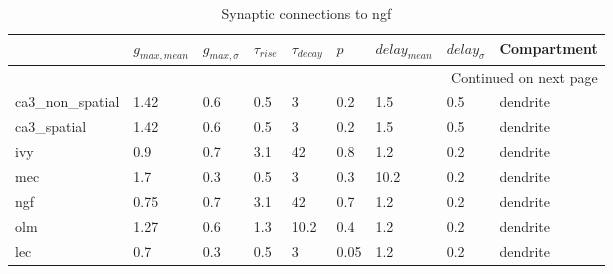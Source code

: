 \begin{longtable}{lllllllll}
\caption{Synaptic connections to ngf}\label{ngf_synapses}\\
\toprule
{} &  $g_{max, mean}$ & $g_{max, \sigma}$ & $\tau_{rise}$ & $\tau_{decay}$ &  $p$ & $delay_{mean}$ & $delay_{\sigma}$ & Compartment \\
\midrule
\endhead
\midrule
\multicolumn{9}{r}{{Continued on next page}} \\
\midrule
\endfoot

\bottomrule
\endlastfoot
ca3\_non\_spatial &  1.42 &      0.6 &      0.5 &         3 &   0.2 &   1.5 &       0.5 &      dendrite\ \\
ca3\_spatial     &  1.42 &      0.6 &      0.5 &         3 &   0.2 &   1.5 &       0.5 &      dendrite\ \\
ivy             &   0.9 &      0.7 &      3.1 &        42 &   0.8 &   1.2 &       0.2 &      dendrite\ \\
mec             &   1.7 &      0.3 &      0.5 &         3 &   0.3 &  10.2 &       0.2 &      dendrite\ \\
ngf             &  0.75 &      0.7 &      3.1 &        42 &   0.7 &   1.2 &       0.2 &      dendrite\ \\
olm             &  1.27 &      0.6 &      1.3 &      10.2 &   0.4 &   1.2 &       0.2 &      dendrite\ \\
lec             &   0.7 &      0.3 &      0.5 &         3 &  0.05 &   1.2 &       0.2 &      dendrite\ \\
\end{longtable}
